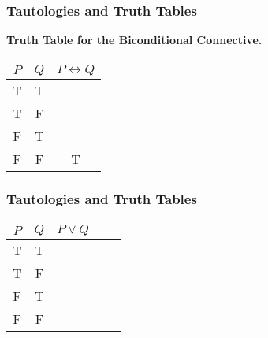 \documentclass{beamer}
\begin{document}
\begin{frame}
	\Large
	\frametitle{Tautologies and Truth Tables}	\textbf{
	Truth Table for the Biconditional Connective.} \bigskip
	\begin{center}
	\begin{tabular}{|c|c|c|}
		\hline $P$  & $Q$ & $P \leftrightarrow Q$ \\ \hline
	\hline T & T &   \\ 
	\hline T & F &    \\ 
	\hline F & T &    \\ 
	\hline \phantom{sp}F \phantom{sp} & \phantom{sp}F \phantom{sp} & \phantom{sp}T \phantom{sp} \\
		\hline 
	\end{tabular} 
	\end{center}
\end{frame}
\begin{frame}
\Large
\frametitle{Tautologies and Truth Tables}
\begin{tabular}{|c|c|c|c|c|}
	\hline $P$ & $Q$ & $P \vee Q$ &  &  \\ \hline
	\hline T & T &  &  &  \\ 
	\hline T & F &  &  &  \\ 
	\hline F & T &  &  &  \\ 
	\hline \phantom{sp}F \phantom{sp} & \phantom{sp}F \phantom{sp} & \phantom{spacespa} & \phantom{spacespa}  & \phantom{spacespa} \\ 

	\hline 
\end{tabular} 

\end{frame}
\begin{frame}
\end{frame}
\end{document}

